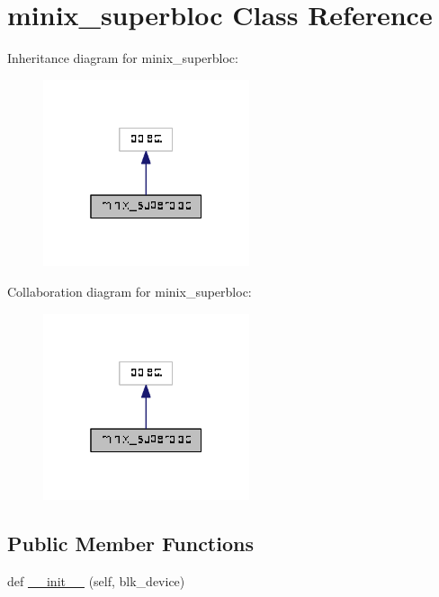 \hypertarget{classminix__superbloc_1_1minix__superbloc}{}\section{minix\+\_\+superbloc Class Reference}
\label{classminix__superbloc_1_1minix__superbloc}


Inheritance diagram for minix\+\_\+superbloc\+:
\nopagebreak
\begin{figure}[H]
\begin{center}
\leavevmode
\includegraphics[width=172pt]{classminix__superbloc_1_1minix__superbloc__inherit__graph}
\end{center}
\end{figure}


Collaboration diagram for minix\+\_\+superbloc\+:
\nopagebreak
\begin{figure}[H]
\begin{center}
\leavevmode
\includegraphics[width=172pt]{classminix__superbloc_1_1minix__superbloc__coll__graph}
\end{center}
\end{figure}
\subsection*{Public Member Functions}
\begin{DoxyCompactItemize}
\item 
def \hyperlink{classminix__superbloc_1_1minix__superbloc_a4c190e7d1ee87ddf6a8b4540bda401bb}{\+\_\+\+\_\+init\+\_\+\+\_\+} (self, blk\+\_\+device)
\end{DoxyCompactItemize}
